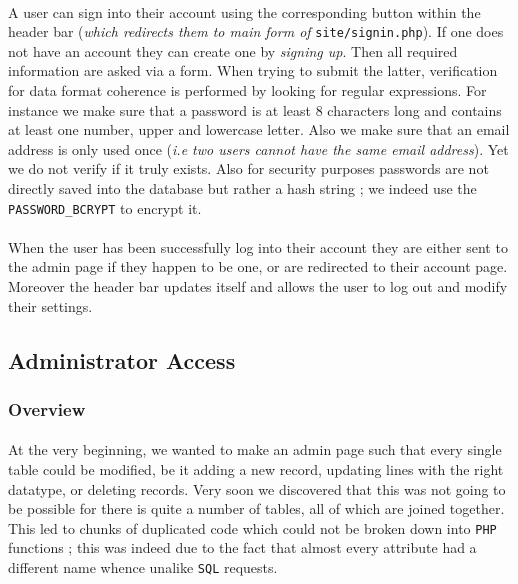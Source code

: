 \documentclass[11pt,a4paper,titlepage]{article}
\begin{document}
\paragraph{}
A user can sign into their account using the corresponding button within the header bar (\textit{which redirects them to main form of} \verb|site/signin.php|). If one does not have an account they can create one by \textit{signing up}. Then all required information are asked via a form. When trying to submit the latter, verification for data format coherence is performed by looking for regular expressions. For instance we make sure that a password is at least 8 characters long and contains at least one number, upper and lowercase letter. Also we make sure that an email address is only used once (\textit{i.e two users cannot have the same email address}). Yet we do not verify if it truly exists. Also for security purposes passwords are not directly saved into the database but rather a hash string ; we indeed use the \verb|PASSWORD_BCRYPT| to encrypt it.

\paragraph{}
When the user has been successfully log into their account they are either sent to the admin page if they happen to be one, or are redirected to their account page. Moreover the header bar updates itself and allows the user to log out and modify their settings.

\subsection{Administrator Access}
\subsubsection{Overview}

\paragraph{}
At the very beginning, we wanted to make an admin page such that every single table could be modified, be it adding a new record, updating lines with the right datatype, or deleting records. Very soon we discovered that this was not going to be possible for there is quite a number of tables, all of which are joined together. This led to chunks of duplicated code which could not be broken down into \verb|PHP| functions ; this was indeed due to the fact that almost every attribute had a different name whence unalike \verb|SQL| requests. 
\end{document}
